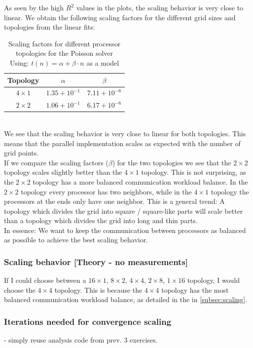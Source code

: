 As seen by the high $R^2$ values in the plots, the scaling behavior is very close to linear. 
We obtain the following scaling factors for the different grid sizes and topologies from the linear fits:
\begin{table}[H]
    \centering
    \begin{tabular}{|c|c|c|}
        \hline
        Topology & $\alpha$ & $\beta$ \\\hline
        $4\times 1$ & $1.35+10^{-1}$ & $7.11+10^{-6}$ \\\hline
        $2\times 2$ & $1.06+10^{-1}$ & $6.17+10^{-6}$ \\\hline
    \end{tabular}
    \caption{Scaling factors for different processor topologies for the Poisson solver\\Using: $t(n) = \alpha + \beta \cdot n$ as a model}
\end{table}
\\
We see that the scaling behavior is very close to linear for both topologies. This means that the parallel implementation scales as expected with the number of grid points.\\
If we compare the scaling factors ($\beta$) for the two topologies we see that the $2\times 2$ topology scales slightly better than the $4\times 1$ topology. This is not surprising, as the $2\times 2$ topology has a more balanced communication workload balance. In the $2\times 2$ topology every processor has two neighbors, while in the $4\times 1$ topology the processors at the ends only have one neighbor. This is a general trend: A topology which divides the grid into square / square-like parts will scale better than a topology which divides the grid into long and thin parts.\\
In essence: We want to keep the communication between processors as balanced as possible to achieve the best scaling behavior.

\subsubsection{Scaling behavior [Theory - no measurements]}
If I could choose between a $16 \times 1$, $8 \times 2$, $4 \times4$, $2 \times 8$, $1 \times 16$ topology, I would choose the $4 \times 4$ topology. This is because the $4 \times 4$ topology has the most balanced communication workload balance, as detailed in the  in \autoref{subsec:scaling}.

\subsubsection{Iterations needed for convergence scaling}
- simply reuse analysis code from prev. 3 exercises.